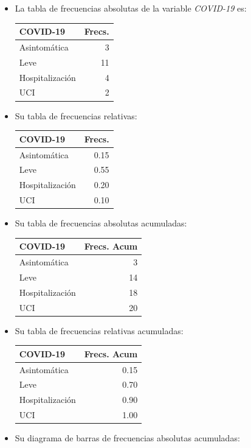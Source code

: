 \documentclass[
]{book}
\providecommand{\tightlist}{%
  \setlength{\itemsep}{0pt}\setlength{\parskip}{0pt}}
\theoremstyle{definition}
\theoremstyle{definition}
\theoremstyle{definition}
\theoremstyle{definition}
\theoremstyle{remark}
\begin{document}
\begin{itemize}
\tightlist
\item
  La tabla de frecuencias absolutas de la variable \emph{COVID-19} es:

  \begin{table}
  \centering
  \begin{tabular}{l|r}
  \hline
  COVID-19 & Frecs.\\
  \hline
  Asintomática & 3\\
  \hline
  Leve & 11\\
  \hline
  Hospitalización & 4\\
  \hline
  UCI & 2\\
  \hline
  \end{tabular}
  \end{table}
\item
  Su tabla de frecuencias relativas:

  \begin{table}
  \centering
  \begin{tabular}{l|r}
  \hline
  COVID-19 & Frecs.\\
  \hline
  Asintomática & 0.15\\
  \hline
  Leve & 0.55\\
  \hline
  Hospitalización & 0.20\\
  \hline
  UCI & 0.10\\
  \hline
  \end{tabular}
  \end{table}
\item
  Su tabla de frecuencias absolutas acumuladas:

  \begin{table}
  \centering
  \begin{tabular}{l|r}
  \hline
  COVID-19 & Frecs. Acum\\
  \hline
  Asintomática & 3\\
  \hline
  Leve & 14\\
  \hline
  Hospitalización & 18\\
  \hline
  UCI & 20\\
  \hline
  \end{tabular}
  \end{table}
\item
  Su tabla de frecuencias relativas acumuladas:

  \begin{table}
  \centering
  \begin{tabular}{l|r}
  \hline
  COVID-19 & Frecs. Acum\\
  \hline
  Asintomática & 0.15\\
  \hline
  Leve & 0.70\\
  \hline
  Hospitalización & 0.90\\
  \hline
  UCI & 1.00\\
  \hline
  \end{tabular}
  \end{table}
\item
  Su diagrama de barras de frecuencias absolutas acumuladas:
\end{itemize}
\end{document}
